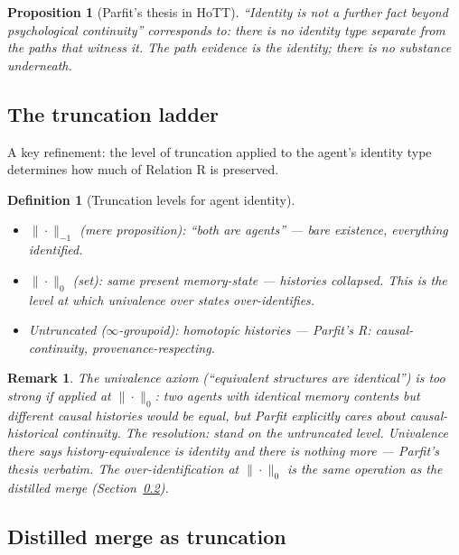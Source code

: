 \documentclass[11pt]{article}
\newtheorem{definition}{Definition}
\newtheorem{proposition}{Proposition}
\newtheorem{remark}{Remark}
\begin{document}
\begin{proposition}[Parfit's thesis in HoTT]
\label{prop:parfit-hott}
``Identity is not a further fact beyond psychological continuity'' corresponds to: there is no
identity type separate from the paths that witness it. The path evidence \emph{is} the identity;
there is no substance underneath.
\end{proposition}

\subsection{The truncation ladder}

A key refinement: the level of truncation applied to the agent's identity type determines how
much of Relation R is preserved.

\begin{definition}[Truncation levels for agent identity]
\label{def:truncation-ladder}
\begin{itemize}
  \item $\|\cdot\|_{-1}$ (mere proposition): ``both are agents'' --- bare existence, everything
        identified.
  \item $\|\cdot\|_0$ (set): same present memory-state --- \emph{histories collapsed}. This is
        the level at which univalence over states over-identifies.
  \item Untruncated ($\infty$-groupoid): homotopic histories --- \emph{Parfit's R:
        causal-continuity, provenance-respecting}.
\end{itemize}
\end{definition}

\begin{remark}
The univalence axiom (``equivalent structures are identical'') is \emph{too strong} if applied
at $\|\cdot\|_0$: two agents with identical memory contents but different causal histories would
be equal, but Parfit explicitly cares about causal-historical continuity. The resolution: stand
on the untruncated level. Univalence there says history-equivalence is identity and there is
nothing more --- Parfit's thesis verbatim. The over-identification at $\|\cdot\|_0$ is the
same operation as the distilled merge (Section~\ref{sec:distilled-merge}).
\end{remark}

\subsection{Distilled merge as truncation}
\label{sec:distilled-merge}
\end{document}
